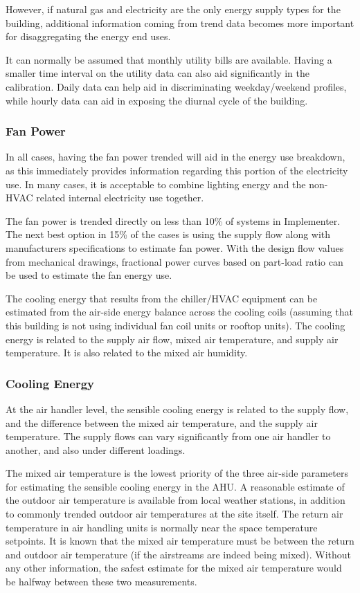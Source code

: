 However, if natural gas and electricity are the only energy supply types
for the building, additional information coming from trend data becomes
more important for disaggregating the energy end uses. 

It can normally be assumed that monthly utility bills are available.
Having a smaller time interval on the utility data can also aid
significantly in the calibration. Daily data can help aid in
discriminating weekday/weekend profiles, while hourly data can aid in
exposing the diurnal cycle of the building. 


\subsubsection{Fan Power}

In all cases, having the fan power trended will aid in the energy use
breakdown, as this immediately provides information regarding this
portion of the electricity use.  In many cases, it is acceptable to
combine lighting energy and the non-HVAC related internal electricity
use together. 

The fan power is trended directly on less than 10\% of systems in
Implementer. The next best option in 15\% of the cases is using the
supply flow along with manufacturers specifications to estimate
fan power. With the design flow values from mechanical drawings,
fractional power curves based on part-load ratio can be used to estimate
the fan energy use. 

The cooling energy that results from the chiller/HVAC equipment can be
estimated from the air-side energy balance across the cooling coils
(assuming that this building is not using individual fan coil units or
rooftop units). The cooling energy is related to the supply air flow,
mixed air temperature, and supply air temperature. It is also related to the mixed
air humidity. 


\subsubsection{Cooling Energy} 

At the air handler level, the sensible cooling energy is related to the
supply flow, and the difference between the mixed air temperature, and
the supply air temperature. The supply flows can vary significantly from
one air handler to another, and also under different loadings. 

The mixed air temperature is the lowest priority of the three air-side
parameters for estimating the sensible cooling energy in the AHU. A
reasonable estimate of the outdoor air temperature is available from
local weather stations, in addition to commonly trended outdoor air
temperatures at the site itself. The return air temperature in air
handling units is normally near the space temperature setpoints. It is
known that the mixed air temperature must be between the return and
outdoor air temperature (if the airstreams are indeed being mixed).
Without any other information, the safest estimate for the mixed air
temperature would be halfway between these two measurements. 

